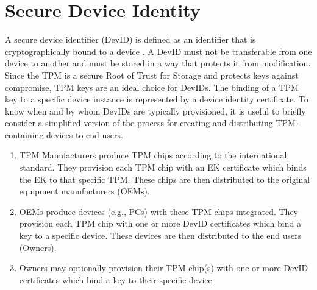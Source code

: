\chapter{Secure Device Identity}


A secure device identifier (DevID) is defined as an identifier that is cryptographically bound to a device \cite{DevIDSpec-IEEE}. A DevID must not be transferable from one device to another and must be stored in a way that protects it from modification. Since the TPM is a secure Root of Trust for Storage and protects keys against compromise, TPM keys are an ideal choice for DevIDs. 
The binding of a TPM key to a specific device instance is represented by a device identity certificate.
To know when and by whom DevIDs are typically provisioned, it is useful to briefly consider a simplified version of the process for creating and distributing TPM-containing devices to end users.
\begin{enumerate}
  \item\label{ite:idTPM} TPM Manufacturers produce TPM chips according to the international standard. They provision each TPM chip with an EK certificate which binds the EK to that specific TPM. These chips are then distributed to the original equipment manufacturers (OEMs).
  \item\label{ite:idDevIni} OEMs produce devices (e.g., PCs) with these TPM chips integrated. They provision each TPM chip with one or more DevID certificates which bind a key to a specific device. These devices are then distributed to the end users (Owners).
  \item\label{ite:idDevLoc} Owners may optionally provision their TPM chip(s) with one or more DevID certificates which bind a key to their specific device.
\end{enumerate} 

